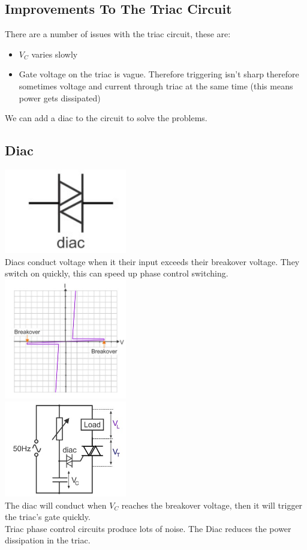 \documentclass[a4paper, 11pt, twocolumn]{article}
\begin{document}
    \subsection{Improvements To The Triac Circuit}
    There are a number of issues with the triac circuit, these are:
    \begin{itemize}
        \item $V_C$ varies slowly
        \item Gate voltage on the triac is vague. Therefore triggering isn't sharp therefore sometimes voltage and current through triac at the same time (this means power gets dissipated)
    \end{itemize}
    We can add a diac to the circuit to solve the problems.
    \subsection{Diac}
    \includegraphics[width=0.4\textwidth]{diac.jpg}\\
    Diacs conduct voltage when it their input exceeds their breakover voltage. They switch on quickly, this can speed up phase control switching.\\
    \includegraphics[width=0.4\textwidth]{diacGraph.jpg}\\
    \includegraphics[width=0.4\textwidth]{diacCircuit.jpg}\\
    The diac will conduct when $V_C$ reaches the breakover voltage, then it will trigger the triac's gate quickly.\\
    Triac phase control circuits produce lots of noise. The Diac reduces the power dissipation in the triac.
\end{document}
